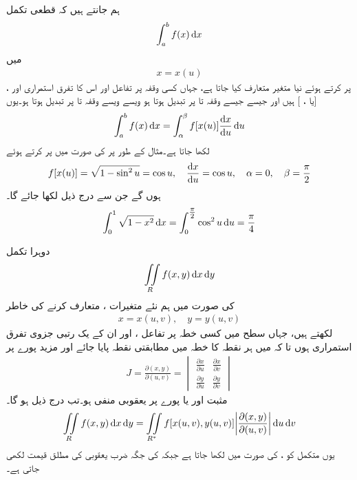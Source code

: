 ہم جانتے ہیں کہ قطعی تکمل
\begin{align*}
\int_a^b f(x)\dif x
\end{align*}
میں
\begin{align*}
x=x(u)
\end{align*}
پر کرتے ہوئے نیا متغیر  متعارف  کیا جاتا ہے، جہاں کسی وقفہ  پر تفاعل  اور اس کا تفرق استمراری   اور ،  [یا ، ] ہیں اور  جیسے جیسے  وقفہ  تا  پر تبدیل ہوتا ہو ویسے ویسے  وقفہ  تا  پر  تبدیل ہوتا ہو۔یوں
\begin{align}
\int_a^b f(x)\dif x=\int_{\alpha}^{\beta} f[x(u)]\frac{\dif x}{\dif u}\dif u
\end{align}
لکھا جاتا ہے۔مثال کے طور پر  کی صورت میں  پر کرتے ہوئے
\begin{align*}
f[x(u)]=\sqrt{1-\sin^2 u}=\cos u, \quad \frac{\dif x}{\dif u}=\cos u, \quad \alpha=0,\quad \beta=\frac{\pi}{2}
\end{align*}
ہوں گے جن سے درج ذیل لکھا جائے گا۔
\begin{align*}
\int_0^1\sqrt{1-x^2}\dif x=\int_{0}^{\tfrac{\pi}{2}} \cos^2 u\dif u=\frac{\pi}{4}
\end{align*}

دوہرا تکمل
\begin{align*}
\iint\limits_R f(x,y)\dif x\dif y
\end{align*}
کی صورت میں ہم نئے متغیرات ،  متعارف کرنے کی خاطر
\begin{align*}
x=x(u,v),\quad y=y(u,v)
\end{align*}
لکھتے ہیں، جہاں  سطح میں کسی خطہ  پر تفاعل ،  اور ان کے یک رتبی جزوی تفرق استمراری ہوں تا کہ  میں ہر نقطہ  کا خطہ  میں مطابقتی نقطہ  پایا جائے اور مزید پورے  پر  
\begin{align*}
J=\frac{\partial (x,y)}{\partial (u,v)}=
\begin{vmatrix}
\frac{\partial x}{\partial u}&\frac{\partial x}{\partial v}\\[0.5em]
\frac{\partial y}{\partial u}&\frac{\partial y}{\partial v}
\end{vmatrix}
\end{align*}
مثبت اور یا پورے  پر یعقوبی  منفی ہو۔تب درج ذیل ہو گا۔
\begin{align}\label{مساوات_خطی_تکمل_دوہرا_تبدیلی_متغیرات}
\iint\limits_R f(x,y)\dif x\dif y=\iint\limits_{R^*} f[x(u,v),y(u,v)]\abs{\frac{\partial (x,y)}{\partial (u,v)}}\dif u\dif v
\end{align}
یوں متکمل کو ،  کی صورت میں لکھا جاتا ہے جبکہ  کی جگہ  ضرب یعقوبی  کی مطلق قیمت لکھی جاتی ہے۔

